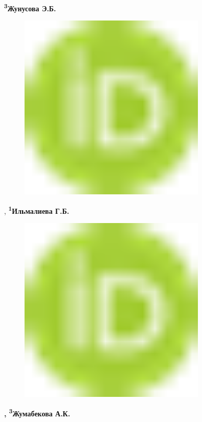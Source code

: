 {\bfseries \textsuperscript{3}Жунусова
Э.Б.}
\begin{figure}[H]
	\centering
	\includegraphics[width=0.8\textwidth]{media/chem2/image1}
	\caption*{}
\end{figure}
,
{\bfseries \textsuperscript{1}Ильмалиева
Г.Б.}
\begin{figure}[H]
	\centering
	\includegraphics[width=0.8\textwidth]{media/chem2/image1}
	\caption*{}
\end{figure}
{\bfseries ,
\textsuperscript{3}Жумабекова
А.К.}
